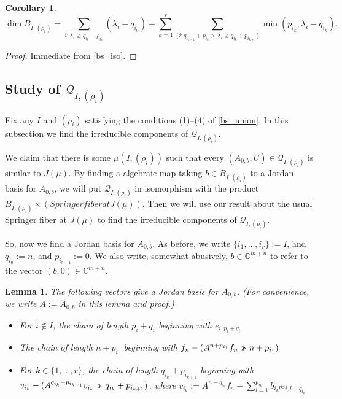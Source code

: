 \documentclass[12pt,psamsfonts]{article}
\newcommand{\leftshift}{\,\texttt{<<}\,}
\newcommand{\rightshift}{\mathbin{\rotatebox[origin=c]{180}{\leftshift}}}
\newtheorem{lemma}[theorem]{Lemma}
\newtheorem{corollary}[theorem]{Corollary}
\begin{document}
\begin{corollary}\label{bs_dim}
    \[\dim B_{I, (\rho_i)} = \sum_{i : \lambda_i \geq q_{i_0} + \rho_{i_1}} (\lambda_i - q_{i_0}) + \sum_{k = 1}^r \sum_{\{i : q_{i_{k - 1}} + p_{i_k} > \lambda_i \geq q_{i_k} + p_{i_{k + 1}}\}} \min(p_{i_k}, \lambda_i - q_{i_k}).\]
\end{corollary}
\begin{proof}
    Immediate from \cref{bs_iso}.
\end{proof}

\subsection{Study of \texorpdfstring{\(\mathcal{Q}_{I, (\rho_i)}\)}{Q\_\{I, (p\_i)\}}}
Fix any \(I\) and \((\rho_i)\) satisfying the conditions (1)--(4) of \cref{bs_union}.
In this subsection we find the irreducible components of \(\mathcal{Q}_{I, (\rho_i)}\).
\par We claim that there is some \(\mu(I, (\rho_i))\) such that every \((A_{0, b}, U) \in \mathcal{Q}_{I, (\rho_i)}\) is similar to \(J(\mu)\).
By finding a algebraic map taking \(b \in B_{I, (\rho_i)}\) to a Jordan basis for \(A_{0,b}\), we will put \(\mathcal{Q}_{I, (\rho_i)}\) in isomorphism with the product \(B_{I, (\rho_i)} \times (Springer fiber at J(\mu))\).
Then we will use our result about the usual Springer fiber at \(J(\mu)\) to find the irreducible components of \(\mathcal{Q}_{I, (\rho_i)}\).
\par So, now we find a Jordan basis for \(A_{0, b}\).
As before, we write \(\{i_1, ..., i_r\} := I\), and \(q_{i_0} := n\), and \(p_{i_{r + 1}} := 0\).
We also write, somewhat abusively, \(b \in \mathbb{C}^{m + n}\) to refer to the vector \((b, 0) \in \mathbb{C}^{m + n}\).
\begin{lemma}
    The following vectors give a Jordan basis for \(A_{0,b}\).
    (For convenience, we write \(A := A_{0,b}\) in this lemma and proof.)
    \begin{itemize}
        \item For \(i \notin I\), the chain of length \(p_i + q_i\) beginning with \(e_{i, p_i + q_i}\)
        \item The chain of length \(n + p_{i_1}\) beginning with \(f_n - (A^{n + p_{i_1}}f_n \rightshift n + p_{i_1})\)
        \item For \(k \in \{1, ..., r\}\), the chain of length \(q_{i_k} + p_{i_{k + 1}}\) beginning with \(v_{i_k} - (A^{q_{i_k} + p_{i_{k + 1}}} v_{i_k} \rightshift q_{i_k} + p_{i_{k + 1}})\), where \(v_{i_k} := A^{n - q_{i_k}} f_n - \sum_{l = 1}^{p_{i_k}} b_{i_kl} e_{i,l + q_{i_k}}\)
    \end{itemize}
\end{lemma}
\end{document}
